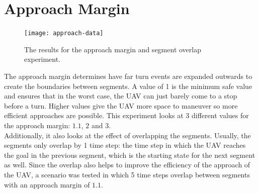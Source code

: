 \section{Approach Margin}
\label{subsec:approach-margin}
\begin{figure}[]
	\centering
	\texttt{[image: approach-data]}
	\caption{The results for the approach margin and segment overlap experiment.}
	\label{fig:approach-data}
\end{figure}
The approach margin determines have far turn events are expanded outwards to create the boundaries between segments. A value of 1 is the minimum safe value and ensures that in the worst case, the UAV can just barely come to a stop before a turn. Higher values give the UAV more space to maneuver so more efficient approaches are possible. This experiment looks at 3 different values for the approach margin: $1.1$, $2$ and $3$. \\
Additionally, it also looks at the effect of overlapping the segments. Usually, the segments only overlap by 1 time step: the time step in which the UAV reaches the goal in the previous segment, which is the starting state for the next segment as well. Since the overlap also helps to improve the efficiency of the approach of the UAV, a scenario was tested in which 5 time steps overlap between segments with an approach margin of $1.1$.

